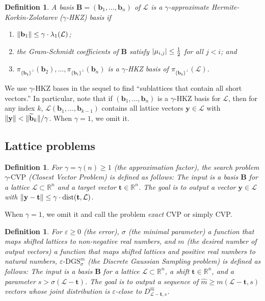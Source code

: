 \documentclass[11pt]{article}
\newtheorem{definition}[theorem]{Definition}
\newcommand{\R}{\ensuremath{\mathbb{R}}}
\newcommand{\eps}{\varepsilon}
\renewcommand{\vec}[1]{\ensuremath{\mathbf{#1}}}
\newcommand{\basis}{\ensuremath{\mathbf{B}}}
\newcommand{\problem}[1]{\mbox{#1}\xspace}
\newcommand{\DGS}[3]{\ensuremath{#1\text{-}\problem{DGS}_{#2}^{#3}}}
\newcommand{\scarequotes}[1]{``#1''}
\newcommand{\lat}{\mathcal{L}}
\newcommand{\gs}[1]{\ensuremath{\widetilde{#1}}}
\DeclareMathOperator{\dist}{dist}
\DeclarePairedDelimiter\abs{\lvert}{\rvert}
\DeclarePairedDelimiter\length{\lVert}{\rVert}
\begin{document}
\begin{definition}
A basis $\basis= (\vec{b}_1,\ldots, \vec{b}_n )$ of $\lat$ is a $\gamma$-approximate Hermite-Korkin-Zolotarev ($\gamma$-HKZ) basis if
\begin{enumerate}
\item $\length{\vec{b}_1} \leq \gamma \cdot \lambda_1(\lat)$;
\item the Gram-Schmidt coefficients of $\basis$ satisfy $\abs{ \mu_{i,j} } \leq \frac{1}{2}$ for all $j<i$; and
\item $\pi_{\{ \vec{b_1} \}^\perp}(\vec{b}_2), \ldots, \pi_{\{ \vec{b}_1 \}^\perp}(\vec{b}_n)$ is a $\gamma$-HKZ basis of $\pi_{\{ \vec{b_1} \}^\perp}(\lat)$.
\end{enumerate}
\end{definition}

We use $\gamma$-HKZ bases in the sequel to find \scarequotes{sublattices that contain all short vectors.} In particular, note that if $(\vec{b}_1, \ldots, \vec{b}_n)$ is a $\gamma$-HKZ basis for $\lat$, then for any index $k$, $\lat(\vec{b}_1,\ldots, \vec{b}_{k-1})$ contains all lattice vectors $\vec{y} \in \lat$ with $\length{\vec{y}} < \length{\gs{\vec{b}}_{k}}/\gamma$. When $\gamma = 1$, we omit it.

\subsection{Lattice problems}

\begin{definition}
For $\gamma = \gamma(n) \geq 1$ (the approximation factor), the search problem $\gamma\text{-}\problem{CVP}$ (Closest Vector Problem) is defined as follows: The input is a basis $\basis$ for a lattice $\lat \subset \R^n$ and a target vector $\vec{t} \in \R^n$. The goal is to output a vector $\vec{y} \in \lat $ with $\length{\vec{y} - \vec{t}} \leq \gamma \cdot \dist(\vec{t}, \lat)$.
\end{definition}

When $\gamma = 1$, we omit it and call the problem \emph{exact} \problem{CVP} or simply \problem{CVP}.

\begin{definition}
\label{def:dgs}
For $\eps \geq 0$ (the error), $\sigma$ (the minimal parameter) a function that maps shifted lattices to non-negative real numbers,
and $m$ (the desired number of output vectors) a function that maps shifted lattices and positive real numbers to natural numbers,
$\DGS{\eps}{\sigma}{m}$ (the Discrete Gaussian Sampling problem) is defined as follows: 
The input is a basis $\basis$ for a lattice $\lat \subset \R^n$, a shift $\vec{t} \in \R^n$, and a parameter $s > \sigma(\lat - \vec{t})$. The goal is to output a sequence of $\hat{m} \geq m(\lat - \vec{t} ,s)$ vectors whose joint distribution is $\eps$-close to $D_{\lat-\vec{t}, s}^{\hat{m}}$.
\end{definition}
\end{document}
